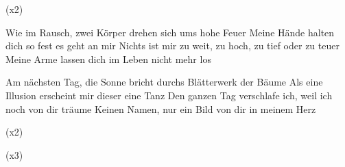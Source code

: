 \begin{guitar}
	 (x2)

	Wie im Rausch, zwei Körper drehen sich ums hohe Feuer 
	Meine Hände halten dich so fest es geht an mir
	Nichts ist mir zu weit, zu hoch, zu tief oder zu teuer
	Meine Arme lassen dich im Leben nicht mehr los
	
	Am nächsten Tag, die Sonne bricht durchs Blätterwerk der Bäume
	Als eine Illusion erscheint mir dieser eine Tanz
	Den ganzen Tag verschlafe ich, weil ich noch von dir träume
	Keinen Namen, nur ein Bild von dir in meinem Herz
	
	  (x2)
	
	 (x3)
\end{guitar}